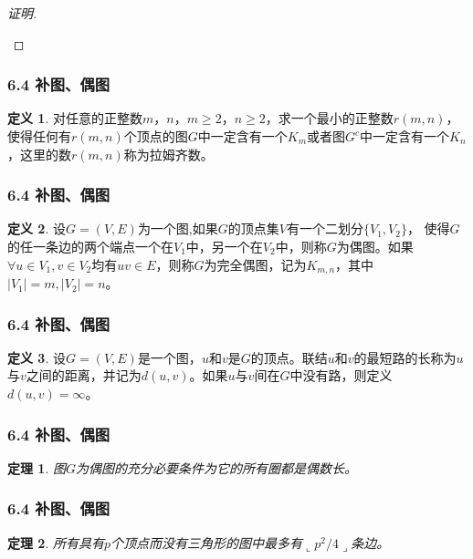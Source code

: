 \documentclass{beamer}
\newtheorem{Thm}{定理}[section]
\theoremstyle{definition}
\newtheorem{Def}{定义}[section]
\theoremstyle{example}
\begin{document}
\begin{CJK*}{UTF8}{gbsn}
\begin{frame}
\begin{proof}[证明]
\begin{itemize}
    \end{itemize}
  \end{proof}
\end{frame}

\begin{frame}
  \frametitle{6.4 补图、偶图}
  \begin{Def}
    对任意的正整数$m$，$n$，$m \geq 2$，$n \geq 2$，求一个最小的正整数$r(m,n)$，
    使得任何有$r(m,n)$个顶点的图$G$中一定含有一个$K_m$或者图$G^c$中一定含有一个$K_n$，这里的数$r(m,n)$称为\alert{拉姆齐数}。
  \end{Def}
\end{frame}

\begin{frame}
  \frametitle{6.4 补图、偶图}
  \begin{Def}\justifying\let\raggedright\justifying
    设$G=(V,E)$为一个图,如果$G$的顶点集$V$有一个二划分$\{V_1,V_2\}$，
    使得$G$的任一条边的两个端点一个在$V_1$中，另一个在$V_2$中，则称$G$为\alert{偶图}。如果$\forall u \in V_1, v \in V_2$均有$uv \in E$，则称$G$为\alert{完全偶图}，记为$K_{m,n}$，其中$|V_1|=m,|V_2|=n$。
  \end{Def}
\end{frame}

\begin{frame}
  \frametitle{6.4 补图、偶图}
  \begin{Def}
    设$G=(V,E)$是一个图，$u$和$v$是$G$的顶点。联结$u$和$v$的最短路的长称为$u$与$v$之间的\alert{距离}，并记为$d(u,v)$。如果$u$与$v$间在$G$中没有路，则定义$d(u,v)=\infty$。
  \end{Def}
\end{frame}

\begin{frame}
  \frametitle{6.4 补图、偶图}
  \begin{Thm}
    图$G$为偶图的充分必要条件为它的所有圈都是偶数长。
  \end{Thm}
\end{frame}

\begin{frame}
  \frametitle{6.4 补图、偶图}
  \begin{Thm}
    所有具有$p$个顶点而没有三角形的图中最多有$\llcorner p^2/4\lrcorner$条边。
  \end{Thm}
\end{frame}


\end{CJK*}
\end{document}
